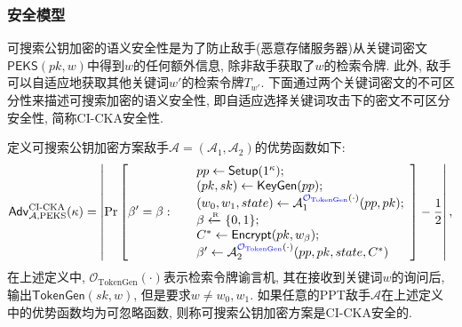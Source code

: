 \subsubsection{安全模型}
可搜索公钥加密的语义安全性是为了防止敌手(恶意存储服务器)从关键词密文$\mathsf{PEKS}(pk, w)$中得到$w$的任何额外信息, 除非敌手获取了$w$的检索令牌. 此外, 敌手可以自适应地获取其他关键词$w'$的检索令牌$T_{w'}$. 下面通过两个关键词密文的不可区分性来描述可搜索加密的语义安全性, 即自适应选择关键词攻击下的密文不可区分安全性, 简称CI-CKA安全性.
\begin{definition}[CI-CKA安全性]
定义可搜索公钥加密方案敌手$\mathcal{A} = (\mathcal{A}_1, \mathcal{A}_2)$的优势函数如下:
\begin{displaymath}
\mathsf{Adv}_{\mathcal{A}, \text{PEKS}}^{\text{CI-CKA}}(\kappa) = \left| \Pr \left[\beta' = \beta:~
\begin{array}{ll}
	& pp \leftarrow \mathsf{Setup}(1^\kappa); \\		
	& (pk, sk) \leftarrow \mathsf{KeyGen}(pp);\\
	& (w_0, w_1, state) \leftarrow \mathcal{A}_1^{{\color{blue} \mathcal{O}_{\text{TokenGen}}}(\cdot)}(pp, pk); \\
	& \beta \xleftarrow{\textup{\tiny R}} \{0, 1\}; \\
	& C^* \leftarrow \mathsf{Encrypt}(pk, w_\beta); \\
	& \beta' \leftarrow \mathcal{A}_2^{{\color{blue} \mathcal{O}_{\text{TokenGen}}}(\cdot)}(pp, pk, state, C^*)
	\end{array} 
\right] - \frac{1}{2} \right|,
\end{displaymath}
在上述定义中, $\mathcal{O}_{\text{TokenGen}}(\cdot)$表示检索令牌谕言机, 其在接收到关键词$w$的询问后, 输出$\mathsf{TokenGen}(sk, w)$, 但是要求$w \neq w_0, w_1$. 如果任意的PPT敌手$\mathcal{A}$在上述定义中的优势函数均为可忽略函数, 则称可搜索公钥加密方案是CI-CKA安全的.
\end{definition}

